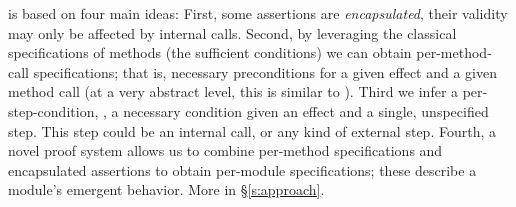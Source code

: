  
\Nec {} is based on four main ideas: 
First, some assertions are \emph{encapsulated}, \ie
their validity may only be affected by internal calls. 
Second, by leveraging the classical  specifications of methods 
(\ie the sufficient conditions) we can obtain per-method-call
 \Nec specifications; that is, necessary preconditions
  for a given effect and a given method call (at a very abstract level, this is
similar to ).
Third we infer a per-step-condition, \ie, a necessary condition given an effect and a single, unspecified step. This step could be an internal call, or any kind of external step.
Fourth,  a novel proof system allows us to combine 
per-method \Nec specifications and encapsulated assertions 
 to obtain per-module   \Nec specifications; these describe a module's
 emergent behavior.
More in \S\ref{s:approach}.
 
